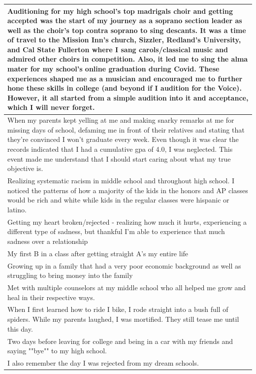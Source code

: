 \documentclass[
  .7em,
  letterpaper,
  DIV=11,
  numbers=noendperiod]{scrartcl}
\begin{document}
\begin{table}
\begin{tabular}{l}
\hline
Auditioning for my high school's top madrigals choir and getting accepted was the start of my journey as a soprano section leader as well as the choir's top contra soprano to sing descants. It was a time of travel to the Mission Inn's church, Sizzler, Redland's University, and Cal State Fullerton where I sang carols/classical music and admired other choirs in competition. Also, it led me to sing the alma mater for my school's online graduation during Covid. These experiences shaped me as a musician and encouraged me to further hone these skills in college (and beyond if I audition for the Voice). However, it all started from a simple audition into it and acceptance, which I will never forget.\\
\hline
When my parents kept yelling at me and making snarky remarks at me for missing days of school, defaming me in front of their relatives and stating that they're convinced I won't graduate every week. Even though it was clear the records indicated that I had a cumulative gpa of 4.0, I was neglected. This event made me understand that I should start caring about what my true objective is.\\
\hline
Realizing systematic racism in middle school and throughout high school. I noticed the patterns of how a majority of the kids in the honors and AP classes would be rich and white while kids in the regular classes were hispanic or latino.\\
\hline
Getting my heart broken/rejected - realizing how much it hurts, experiencing a different type of sadness, but thankful I'm able to experience that much sadness over a relationship\\
\hline
My first B in a class after getting straight A’s my entire life\\
\hline
Growing up in a family that had a very poor economic background as well as struggling to bring money into the family\\
\hline
Met with multiple counselors at my middle school who all helped me grow and heal in their respective ways.\\
\hline
When I first learned how to ride I bike, I rode straight into a bush full of spiders. While my parents laughed, I was mortified. They still tease me until this day.\\
\hline
Two days before leaving for college and being in a car with my friends and saying ""bye"" to my high school.\\
\hline
I also remember the day I was rejected from my dream schools.\\

\end{tabular}
\end{table}
\end{document}
